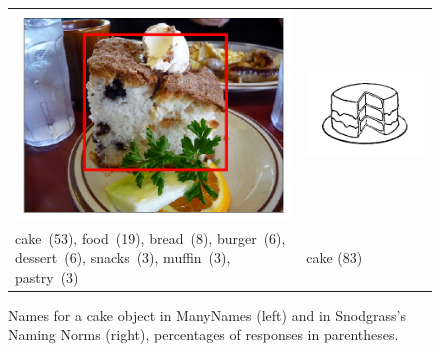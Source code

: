 \begin{figure}[tbp]
\scriptsize
\begin{tabular}{p{4.3cm}p{2cm}}
\centering
\includegraphics[scale=0.15]{figures/2390077_1254219_supercat_unique.png} &
\includegraphics[scale=0.4]{figures/snodgrass_vanderwart_cake_042.png}\\
 cake\ (53),  food\ (19), bread\ (8), burger\ (6), dessert\ (6), snacks\ (3), muffin\ (3),  pastry\ (3) & \hspace{.9cm} cake (83)
\end{tabular}
\caption{Names for a cake object in ManyNames (left) and in Snodgrass's Naming Norms (right), percentages of responses in parentheses.}
\label{fig:cake}
\end{figure}

